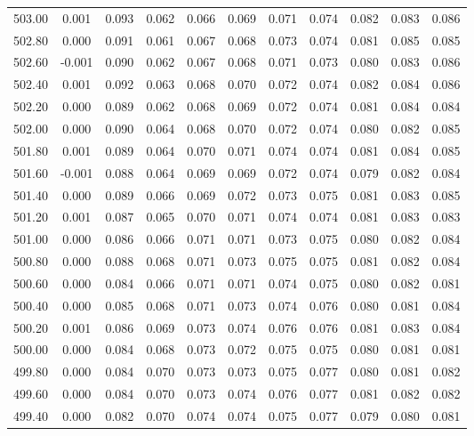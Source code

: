 \begin{longtable}{cccccccccc}
    503.00 &  0.001 &  0.093 &  0.062 &  0.066 &  0.069 &  0.071 &  0.074 &  0.082 &  0.083 &  0.086 \\
    502.80 &  0.000 &  0.091 &  0.061 &  0.067 &  0.068 &  0.073 &  0.074 &  0.081 &  0.085 &  0.085 \\
    502.60 & -0.001 &  0.090 &  0.062 &  0.067 &  0.068 &  0.071 &  0.073 &  0.080 &  0.083 &  0.086 \\
    502.40 &  0.001 &  0.092 &  0.063 &  0.068 &  0.070 &  0.072 &  0.074 &  0.082 &  0.084 &  0.086 \\
    502.20 &  0.000 &  0.089 &  0.062 &  0.068 &  0.069 &  0.072 &  0.074 &  0.081 &  0.084 &  0.084 \\
    502.00 &  0.000 &  0.090 &  0.064 &  0.068 &  0.070 &  0.072 &  0.074 &  0.080 &  0.082 &  0.085 \\
    501.80 &  0.001 &  0.089 &  0.064 &  0.070 &  0.071 &  0.074 &  0.074 &  0.081 &  0.084 &  0.085 \\
    501.60 & -0.001 &  0.088 &  0.064 &  0.069 &  0.069 &  0.072 &  0.074 &  0.079 &  0.082 &  0.084 \\
    501.40 &  0.000 &  0.089 &  0.066 &  0.069 &  0.072 &  0.073 &  0.075 &  0.081 &  0.083 &  0.085 \\
    501.20 &  0.001 &  0.087 &  0.065 &  0.070 &  0.071 &  0.074 &  0.074 &  0.081 &  0.083 &  0.083 \\
    501.00 &  0.000 &  0.086 &  0.066 &  0.071 &  0.071 &  0.073 &  0.075 &  0.080 &  0.082 &  0.084 \\
    500.80 &  0.000 &  0.088 &  0.068 &  0.071 &  0.073 &  0.075 &  0.075 &  0.081 &  0.082 &  0.084 \\
    500.60 &  0.000 &  0.084 &  0.066 &  0.071 &  0.071 &  0.074 &  0.075 &  0.080 &  0.082 &  0.081 \\
    500.40 &  0.000 &  0.085 &  0.068 &  0.071 &  0.073 &  0.074 &  0.076 &  0.080 &  0.081 &  0.084 \\
    500.20 &  0.001 &  0.086 &  0.069 &  0.073 &  0.074 &  0.076 &  0.076 &  0.081 &  0.083 &  0.084 \\
    500.00 &  0.000 &  0.084 &  0.068 &  0.073 &  0.072 &  0.075 &  0.075 &  0.080 &  0.081 &  0.081 \\
    499.80 &  0.000 &  0.084 &  0.070 &  0.073 &  0.073 &  0.075 &  0.077 &  0.080 &  0.081 &  0.082 \\
    499.60 &  0.000 &  0.084 &  0.070 &  0.073 &  0.074 &  0.076 &  0.077 &  0.081 &  0.082 &  0.082 \\
    499.40 &  0.000 &  0.082 &  0.070 &  0.074 &  0.074 &  0.075 &  0.077 &  0.079 &  0.080 &  0.081 \\

\end{longtable}
